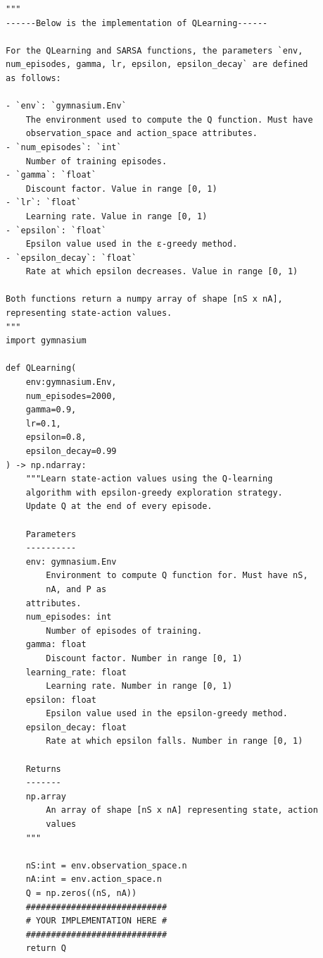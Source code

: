 \documentclass[a4paper,12pt]{article}
\begin{document}
\begin{appendices}
\begin{verbatim}
"""
------Below is the implementation of QLearning------

For the QLearning and SARSA functions, the parameters `env, 
num_episodes, gamma, lr, epsilon, epsilon_decay` are defined 
as follows:

- `env`: `gymnasium.Env`
    The environment used to compute the Q function. Must have 
    observation_space and action_space attributes.
- `num_episodes`: `int`
    Number of training episodes.
- `gamma`: `float`
    Discount factor. Value in range [0, 1)
- `lr`: `float`
    Learning rate. Value in range [0, 1)
- `epsilon`: `float`
    Epsilon value used in the ε-greedy method.
- `epsilon_decay`: `float`
    Rate at which epsilon decreases. Value in range [0, 1)

Both functions return a numpy array of shape [nS x nA], 
representing state-action values.
"""
import gymnasium

def QLearning(
    env:gymnasium.Env, 
    num_episodes=2000, 
    gamma=0.9, 
    lr=0.1, 
    epsilon=0.8, 
    epsilon_decay=0.99
) -> np.ndarray:
    """Learn state-action values using the Q-learning 
    algorithm with epsilon-greedy exploration strategy.
    Update Q at the end of every episode.

    Parameters
    ----------
    env: gymnasium.Env
        Environment to compute Q function for. Must have nS, 
        nA, and P as
    attributes.
    num_episodes: int
        Number of episodes of training.
    gamma: float
        Discount factor. Number in range [0, 1)
    learning_rate: float
        Learning rate. Number in range [0, 1)
    epsilon: float
        Epsilon value used in the epsilon-greedy method.
    epsilon_decay: float
        Rate at which epsilon falls. Number in range [0, 1)

    Returns
    -------
    np.array
        An array of shape [nS x nA] representing state, action 
        values
    """

    nS:int = env.observation_space.n
    nA:int = env.action_space.n
    Q = np.zeros((nS, nA))
    ############################
    # YOUR IMPLEMENTATION HERE #
    ############################
    return Q

\end{verbatim}

\end{appendices}
\end{document}
